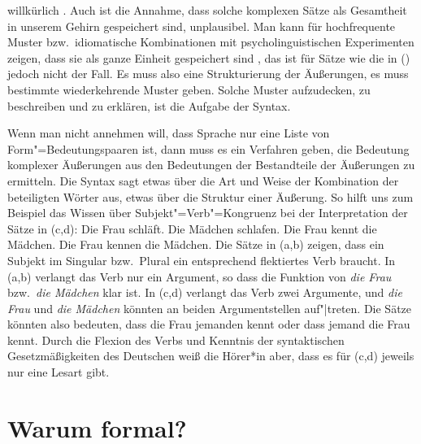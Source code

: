 willkürlich \parencites[]{Harris57a}[]{Chomsky57a}. Auch ist die Annahme, dass
solche komplexen Sätze als Gesamtheit in unserem Gehirn gespeichert sind, unplausibel. Man kann für
hochfrequente Muster bzw.\ idiomatische Kombinationen mit psycholinguistischen Experimenten zeigen,
dass sie als ganze Einheit gespeichert\label{page-gespeicherte-Chunks} sind
\parencites{Bybee95a-u}{Langacker87a-u}[228--229]{PJ2005a}[64]{Goldberg2006a}[Kapitel~3]{Bybee2010a-u},
 das ist für Sätze wie die in () jedoch nicht der
Fall. Es muss also eine Strukturierung der Äußerungen, es muss bestimmte wiederkehrende Muster
geben. Solche Muster aufzudecken, zu beschreiben und zu erklären, ist die Aufgabe der Syntax.

Wenn man nicht annehmen will, dass Sprache nur eine Liste von Form"=Bedeutungspaaren
ist, dann muss es ein Verfahren geben, die Bedeutung komplexer Äußerungen aus
den Bedeutungen der Bestandteile der Äußerungen zu ermitteln.
Die Syntax sagt etwas über die Art und Weise der Kombination der beteiligten
Wörter aus, etwas über die Struktur einer Äußerung.
So hilft uns zum Beispiel das Wissen über Subjekt"=Verb"=Kongruenz bei der Interpretation
der Sätze in (c,d):
\eal
\ex Die Frau schläft.
\ex Die Mädchen schlafen.
\ex Die Frau kennt  die Mädchen.
\ex Die Frau kennen die Mädchen.
\zl
Die Sätze in (a,b) zeigen, dass ein Subjekt im Singular bzw.\ Plural
ein entsprechend flektiertes Verb braucht. In (a,b) verlangt das Verb nur ein
Argument, so dass die Funktion von \emph{die Frau} bzw.\ \emph{die Mädchen} klar ist.
In (c,d) verlangt das Verb zwei Argumente, und \emph{die Frau} und \emph{die Mädchen}
könnten an beiden Argumentstellen auf"|treten. Die Sätze könnten also bedeuten, dass
die Frau jemanden kennt oder dass jemand die Frau kennt. Durch die Flexion des Verbs und
Kenntnis der syntaktischen Gesetzmäßigkeiten des Deutschen weiß die Hörer*in
aber, dass es für (c,d) jeweils nur eine Lesart gibt.



\section{Warum formal?}
\label{sec-formal}


